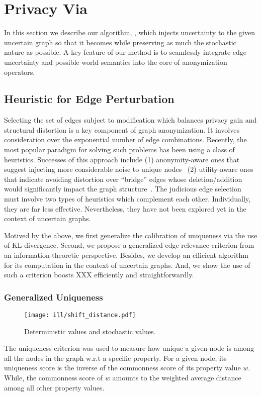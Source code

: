 \section{Privacy Via {\methodName}}
In this section we describe our algorithm, {\methodName}, which injects uncertainty to the given uncertain graph so that it becomes {\keobf} while preserving as much the stochastic nature as possible. A key feature of our method is to seamlessly integrate edge uncertainty and possible world semantics into the core of anonymization operators. 
% 
\subsection{Heuristic for Edge Perturbation}

Selecting the set of edges subject to modification which balances privacy gain and structural distortion is 
a key component of graph anonymization. 
It involves consideration over the exponential number of edge combinations. 
Recently, the most popular paradigm for solving such problems has been using a class of heuristics. 
Successes of this approach include
(1) anonymity-aware ones that suggest injecting more considerable noise to unique nodes~\cite{Ying2009,Boldi_Injecting_2012,Hay_Anonymizing_2007} 
(2) utility-aware ones that indicate avoiding distortion over “bridge” edges whose deletion/addition would significantly impact the graph structure~\cite{Wang2011,Ninggal_Utility_2015}. 
The judicious edge selection must involve two types of heuristics which complement each other. 
Individually, they are far less effective. 
Nevertheless, they have not been explored yet in the context of uncertain graphs.

Motived by the above, we first generalize the calibration of uniqueness via the use of KL-divergence. 
Second, we propose a generalized edge relevance criterion from an information-theoretic perspective.
Besides, we develop an efficient algorithm for its computation in the context of uncertain graphs.
And, we show the use of such a criterion boosts XXX efficiently and straightforwardly.

\subsubsection{Generalized Uniqueness}

\begin{figure}
	\centering
        \texttt{[image: ill/shift\_distance.pdf]}
    \caption{Deterministic values and stochastic values.}
\end{figure}
The uniqueness criterion was used to measure how unique a given node is among all the nodes in the graph w.r.t a specific property. 
For a given node, its uniqueness score is the inverse of the commonness score of its property value $w$.
While, the commonness score of $w$ amounts to the weighted average distance among all other property values. 

